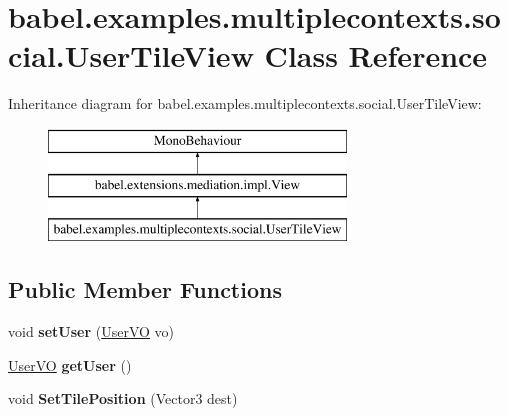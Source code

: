 \hypertarget{classbabel_1_1examples_1_1multiplecontexts_1_1social_1_1_user_tile_view}{\section{babel.\-examples.\-multiplecontexts.\-social.\-User\-Tile\-View Class Reference}
\label{classbabel_1_1examples_1_1multiplecontexts_1_1social_1_1_user_tile_view}
}
Inheritance diagram for babel.\-examples.\-multiplecontexts.\-social.\-User\-Tile\-View\-:\begin{figure}[H]
\begin{center}
\leavevmode
\includegraphics[height=3.000000cm]{classbabel_1_1examples_1_1multiplecontexts_1_1social_1_1_user_tile_view}
\end{center}
\end{figure}
\subsection*{Public Member Functions}
\begin{DoxyCompactItemize}
\item 
\hypertarget{classbabel_1_1examples_1_1multiplecontexts_1_1social_1_1_user_tile_view_a7c2a8da718b450aac9a2742ddfe4bf87}{void {\bfseries set\-User} (\hyperlink{classbabel_1_1examples_1_1multiplecontexts_1_1social_1_1_user_v_o}{User\-V\-O} vo)}\label{classbabel_1_1examples_1_1multiplecontexts_1_1social_1_1_user_tile_view_a7c2a8da718b450aac9a2742ddfe4bf87}

\item 
\hypertarget{classbabel_1_1examples_1_1multiplecontexts_1_1social_1_1_user_tile_view_aa118cb90c19047c501e9b45b46c0492c}{\hyperlink{classbabel_1_1examples_1_1multiplecontexts_1_1social_1_1_user_v_o}{User\-V\-O} {\bfseries get\-User} ()}\label{classbabel_1_1examples_1_1multiplecontexts_1_1social_1_1_user_tile_view_aa118cb90c19047c501e9b45b46c0492c}

\item 
\hypertarget{classbabel_1_1examples_1_1multiplecontexts_1_1social_1_1_user_tile_view_aa60eedd4420fe9db76aa661860da6e80}{void {\bfseries Set\-Tile\-Position} (Vector3 dest)}\label{classbabel_1_1examples_1_1multiplecontexts_1_1social_1_1_user_tile_view_aa60eedd4420fe9db76aa661860da6e80}

\end{DoxyCompactItemize}

